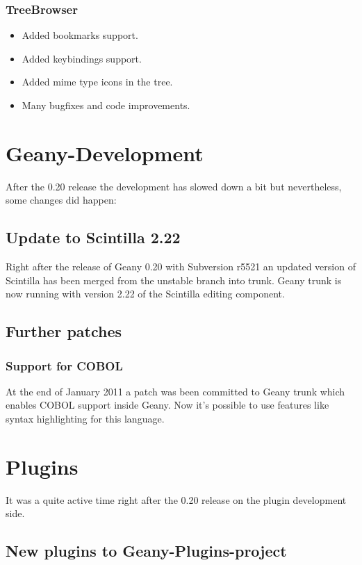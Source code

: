 \documentclass[%
paper=a4,%
fontsize=12pt,%
twoside=false,%
DIV18,
headsepline,
plainheadsepline,
footsepline,
plainfootsepline,
parskip=half,%
openany,%
]{scrartcl}
\begin{document}
\subsubsection{TreeBrowser}
\begin{itemize}
	\item Added bookmarks support.
	\item Added keybindings support.
	\item Added mime type icons in the tree.
	\item Many bugfixes and code improvements.
\end{itemize}

\section{Geany-Development}

After the 0.20 release the development has slowed down a bit but
nevertheless, some changes did happen:

\subsection{Update to Scintilla 2.22}

Right after the release of Geany 0.20 with Subversion r5521 an
updated version of Scintilla has been merged from the unstable branch
into trunk. Geany trunk is now running with version 2.22 of
the Scintilla editing component.

\subsection{Further patches}
\subsubsection{Support for COBOL}

At the end of January 2011 a patch was been committed to Geany trunk which
enables COBOL support inside Geany. Now it's possible to use
features like syntax highlighting for this language.


\section{Plugins}

It was a quite active time right after the 0.20 release on the plugin
development side.

\subsection{New plugins to Geany-Plugins-project}
\end{document}
